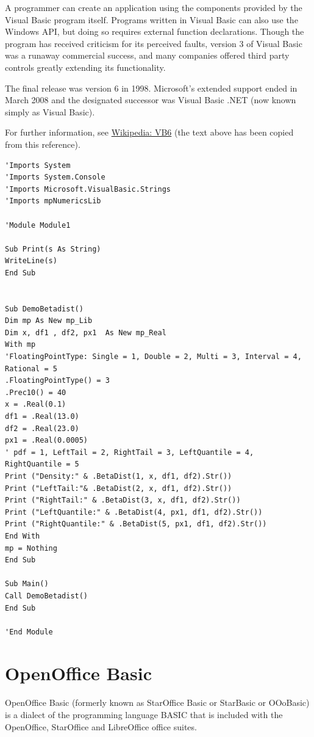 \vpara
A programmer can create an application using the components provided by the Visual Basic program itself. Programs written in Visual Basic can also use the Windows API, but doing so requires external function declarations. Though the program has received criticism for its perceived faults, version 3 of Visual Basic was a runaway commercial success, and many companies offered third party controls greatly extending its functionality.

\vpara
The final release was version 6 in 1998. Microsoft's extended support ended in March 2008 and the designated successor was Visual Basic .NET (now known simply as Visual Basic).

For further information, see \href{http://en.wikipedia.org/wiki/Visual_Basic}{Wikipedia: VB6} (the text above has been copied from this reference).

\begin{lstlisting}
'Imports System
'Imports System.Console
'Imports Microsoft.VisualBasic.Strings
'Imports mpNumericsLib

'Module Module1

Sub Print(s As String)
WriteLine(s)
End Sub


Sub DemoBetadist()
Dim mp As New mp_Lib
Dim x, df1 , df2, px1  As New mp_Real
With mp
'FloatingPointType: Single = 1, Double = 2, Multi = 3, Interval = 4, Rational = 5
.FloatingPointType() = 3
.Prec10() = 40
x = .Real(0.1)
df1 = .Real(13.0)
df2 = .Real(23.0)
px1 = .Real(0.0005)	
' pdf = 1, LeftTail = 2, RightTail = 3, LeftQuantile = 4, RightQuantile = 5
Print ("Density:" & .BetaDist(1, x, df1, df2).Str())
Print ("LeftTail:"& .BetaDist(2, x, df1, df2).Str())
Print ("RightTail:" & .BetaDist(3, x, df1, df2).Str())
Print ("LeftQuantile:" & .BetaDist(4, px1, df1, df2).Str())
Print ("RightQuantile:" & .BetaDist(5, px1, df1, df2).Str())
End With
mp = Nothing
End Sub

Sub Main()
Call DemoBetadist()
End Sub

'End Module
\end{lstlisting}




\newpage
\section{OpenOffice Basic}

OpenOffice Basic (formerly known as StarOffice Basic or StarBasic or OOoBasic) is a dialect of the programming language BASIC that is included with the OpenOffice, StarOffice and LibreOffice office suites.

